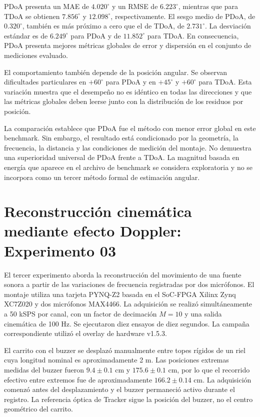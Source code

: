 PDoA presenta un MAE de $4.020^\circ$ y un RMSE de
$6.223^\circ$, mientras que para TDoA se obtienen
$7.856^\circ$ y $12.098^\circ$, respectivamente. El sesgo
medio de PDoA, de $0.320^\circ$, también es más próximo a
cero que el de TDoA, de $2.731^\circ$. La desviación estándar
es de $6.249^\circ$ para PDoA y de $11.852^\circ$ para TDoA.
En consecuencia, PDoA presenta mejores métricas globales
de error y dispersión en el conjunto de mediciones evaluado.

El comportamiento también depende de la posición angular.
Se observan dificultades particulares en $+60^\circ$ para
PDoA y en $+45^\circ$ y $+60^\circ$ para TDoA. Esta variación
muestra que el desempeño no es idéntico en todas las
direcciones y que las métricas globales deben leerse junto
con la distribución de los residuos por posición.

La comparación establece que PDoA fue el método con menor
error global en este benchmark. Sin embargo, el resultado
está condicionado por la geometría, la frecuencia, la
distancia y las condiciones de medición del montaje. No
demuestra una superioridad universal de PDoA frente a TDoA.
La magnitud basada en energía que aparece en el archivo de
benchmark se considera exploratoria y no se incorpora como
un tercer método formal de estimación angular.

\section{Reconstrucción cinemática mediante efecto Doppler: Experimento 03}
\label{sec:exp03}

El tercer experimento aborda la reconstrucción del movimiento
de una fuente sonora a partir de las variaciones de frecuencia
registradas por dos micrófonos. El montaje utiliza una tarjeta
PYNQ-Z2 basada en el SoC-FPGA Xilinx Zynq XC7Z020 y dos
micrófonos MAX4466. La adquisición se realizó simultáneamente
a 50 kSPS por canal, con un factor de decimación $M=10$ y
una salida cinemática de 100 Hz. Se ejecutaron diez ensayos
de diez segundos. La campaña correspondiente utilizó el
overlay de hardware v1.5.3.

El carrito con el buzzer se desplazó manualmente entre topes
rígidos de un riel cuya longitud nominal es aproximadamente
2 m. Las posiciones extremas medidas del buzzer fueron
$9.4\pm0.1$ cm y $175.6\pm0.1$ cm, por lo que el recorrido
efectivo entre extremos fue de aproximadamente
$166.2\pm0.14$ cm. La adquisición comenzó antes del
desplazamiento y el buzzer permaneció activo durante el
registro. La referencia óptica de Tracker sigue la posición
del buzzer, no el centro geométrico del carrito.

